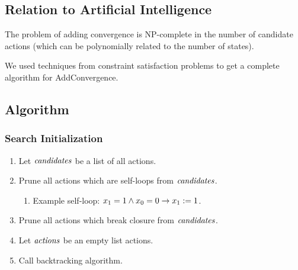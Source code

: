 \subsection{Relation to Artificial Intelligence}

The problem of adding convergence is NP-complete in the number of candidate actions (which can be polynomially related to the number of states).

We used techniques from constraint satisfaction problems to get a complete algorithm for AddConvergence.

\subsection{Algorithm}
\subsubsection{Search Initialization}
\begin{enumerate}
\item Let $\mathit{candidates}$ be a list of all actions.
\item Prune all actions which are self-loops from $\mathit{candidates}$.
 \begin{enumerate}
 \item[] Example self-loop: $x_1 = 1 \wedge x_0 = 0 \to x_1:= 1$.
 \end{enumerate}
\item Prune all actions which break closure from $\mathit{candidates}$.
\item Let $\mathit{actions}$ be an empty list actions.
\item Call backtracking algorithm.
\end{enumerate}

